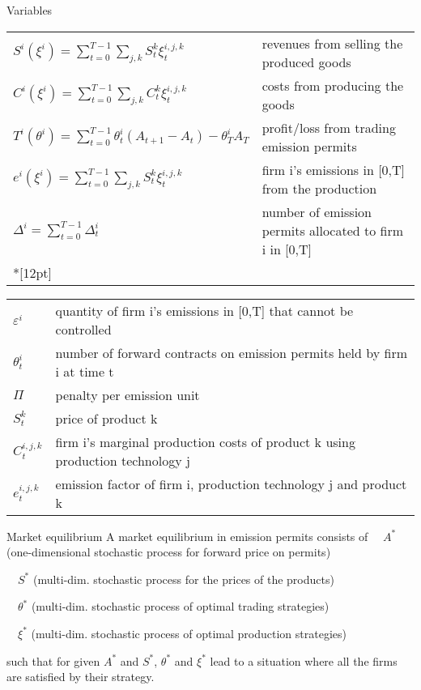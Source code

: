 Variables
\begin{tiny}
	\begin{tabular}{ll}
	$S^i(\xi^i) =    \sum_{t=0}^{T-1} \sum_{j, k} S^k_t \xi^{i,j,k}_t$ & revenues from selling the produced goods \\
	$C^i(\xi^i) =    \sum_{t=0}^{T-1} \sum_{j, k} C^k_t \xi^{i,j,k}_t$ & costs from producing the goods \\
	$T^i(\theta^i) = \sum_{t=0}^{T-1} \theta^i_t (A_{t+1} - A_t) - \theta_T^i A_T$ & profit/loss from trading emission permits \\
	$e^i(\xi^i) =    \sum_{t=0}^{T-1} \sum_{j, k} S^k_t \xi^{i,j,k}_t$ & firm i's emissions in [0,T] from the production\\
	$\Delta^i = \sum_{t=0}^{T-1} \Delta^i_t$ & number of emission permits allocated to firm i in [0,T] \\*[12pt]
	\end{tabular}

	\begin{tabular}{ll}
	$\varepsilon^i$ & quantity of firm i's emissions in [0,T] that cannot be controlled\\
	$\theta^i_t$ & number of forward contracts on emission permits held by firm i at time t\\
	$\Pi$ & penalty per emission unit \\
	$S_t^k$ & price of product k\\
	$C_t^{i,j,k}$ & firm i's marginal production costs of product k using production technology j\\
	$e_t^{i,j,k}$ & emission factor of firm i, production technology j and product k \\
	\end{tabular}
\end{tiny}


Market equilibrium
	A market equilibrium in emission permits consists of
		$\quad A^*$ (one-dimensional stochastic process for forward price on permits)
		
		$\quad S^*$ (multi-dim. stochastic process for the prices of the products)
		
		$\quad \theta^*$ (multi-dim. stochastic process of optimal trading strategies)
		
		$\quad \xi^*$ (multi-dim. stochastic process of optimal production strategies)

	such that for given $A^*$ and $S^*$,
		$\theta^*$ and $\xi^*$ lead to a situation where all the firms are satisfied by their strategy.

